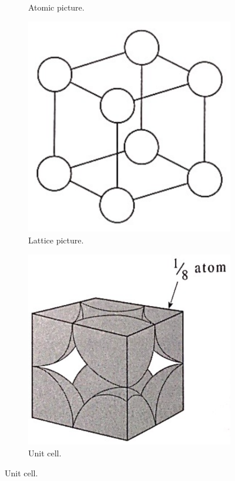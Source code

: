 \documentclass[../notes.tex]{subfiles}
\begin{document}
\begin{itemize}
\begin{figure}[h!]
\begin{subfigure}[b]{0.2\linewidth}
            \caption{Atomic picture.}
            \label{fig:PCunitCella}
        \end{subfigure}
        \begin{subfigure}[b]{0.2\linewidth}
            \centering
            \includegraphics[width=0.65\linewidth]{../ExtFiles/PCunitCellb.png}
            \caption{Lattice picture.}
            \label{fig:PCunitCellb}
        \end{subfigure}
        \begin{subfigure}[b]{0.2\linewidth}
            \centering
            \includegraphics[width=0.85\linewidth]{../ExtFiles/PCunitCellc.png}
            \caption{Unit cell.}
            \label{fig:PCunitCellc}
        \end{subfigure}

\end{figure}
\end{itemize}
\end{document}
